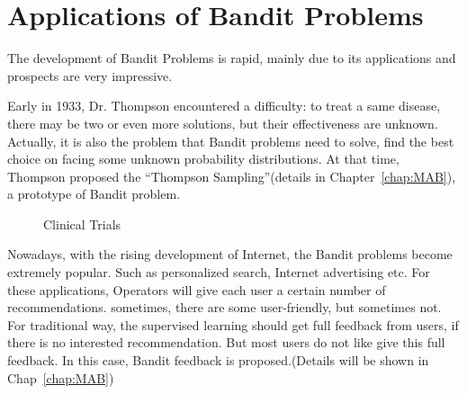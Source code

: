 \section{Applications of Bandit Problems}
\label{sec:application}
The development of Bandit Problems is rapid, mainly due to its applications and prospects are very impressive.

Early in 1933, Dr. Thompson encountered a difficulty: to treat a same disease, there may be two or even more solutions, but their effectiveness are unknown. Actually, it is also the problem that Bandit problems need to solve, find the best choice on facing some  unknown probability distributions. At that time, Thompson proposed the ``Thompson Sampling''(details in Chapter~\ref{chap:MAB}), a prototype of Bandit problem.
\begin{figure}[!h]
\caption{Clinical Trials}
\end{figure}

Nowadays, with the rising development of Internet, the Bandit problems become extremely popular. Such as personalized search, Internet advertising etc. For these applications, Operators will give each user a certain number of recommendations. sometimes, there are some user-friendly, but sometimes not. For traditional way, the supervised learning should get full feedback from users, if there is no interested recommendation. But most users do not like give this full feedback. In this case, Bandit feedback is proposed.(Details will be shown in Chap~\ref{chap:MAB})
\begin{figure}[!h]
\end{figure}


